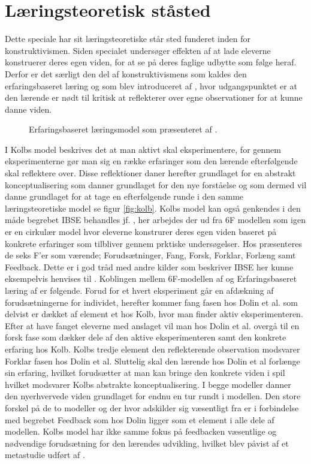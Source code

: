 \section{Læringsteoretisk ståsted}
\label{sec:2.0}
Dette speciale har sit læringsteoretiske står sted funderet inden for konstruktivismen. Siden specialet undersøger effekten af at lade eleverne konstruerer deres egen viden, for at se på deres faglige udbytte som følge heraf. Derfor er det særligt den del af konstruktivismens som kaldes den erfaringsbaseret læring og som blev introduceret af \citet{Kolb1984}, hvor udgangspunktet er at den lærende er nødt til kritisk at reflekterer over egne observationer for at kunne danne viden. 
\begin{figure}
	\centering
	\caption{Erfaringsbaseret læringsmodel som præsenteret af \citep{Kolb1984}.}
	\label{fig:kolb}
\end{figure}
I Kolbs model beskrives det at man aktivt skal eksperimentere, for gennem eksperimenterne gør man sig en række erfaringer som den lærende efterfølgende skal reflektere over. Disse reflektioner daner herefter grundlaget for en abstrakt konceptualisering som danner grundlaget for den nye forståelse og som dermed vil danne grundlaget for at tage en efterfølgende runde i den samme læringsteoretiske model se figur \vref{fig:kolb}. 
Kolbs model kan også genkendes i den måde begrebet IBSE behandles jf. \citep{Dolin2014}, her arbejdes der ud fra 6F modellen som igen er en  cirkulær model hvor eleverne konstrurer deres egen viden baseret på konkrete erfaringer som tilbliver gennem prktiske undersøgelser. Hos \citet{Dolin2014} præsenteres de seks F'er som værende; Forudsætninger, Fang, Forsk, Forklar, Forlæng samt Feedback. Dette er i god tråd med andre kilder som beskriver IBSE her kunne eksempelvis henvises til \citep{Krogh2016}.
Koblingen mellem 6F-modellen af \citep{Dolin2014} og Erfaringsbaseret læring af \citep{Kolb1984} er følgende. Forud for et hvert eksperiment går en afdækning af forudsætningerne for individet, herefter kommer fang fasen hos Dolin et al. som delvist er dækket af element et hos Kolb, hvor man finder aktiv eksperimenteren. Efter at have fanget eleverne med anslaget vil man hos Dolin et al. overgå til en forsk fase som dækker dele af den aktive eksperimenteren samt den konkrete erfaring hos Kolb. Kolbs tredje element den reflekterende observation modsvarer Forklar fasen hos Dolin et al. Sluttelig skal den lærende hos Dolin et al forlænge sin erfaring, hvilket forudsætter at man kan bringe den konkrete viden i spil hvilket modsvarer Kolbs abstrakte konceptualisering. I begge modeller danner den nyerhvervede viden grundlaget for endnu en tur rundt i modellen.
Den store forskel på de to modeller og der hvor \citet{Dolin2014} adskilder sig væsentligt fra \citet{Kolb1984} er i forbindelse med begrebet Feedback som hos Dolin ligger som et element i alle dele af modellen. Kolbs model har ikke samme fokus på feedbacken væsentlige og nødvendige forudsætning for den lærendes udvikling, hvilket blev påvist af et metastudie udført af \citep{Hattie2015}.

